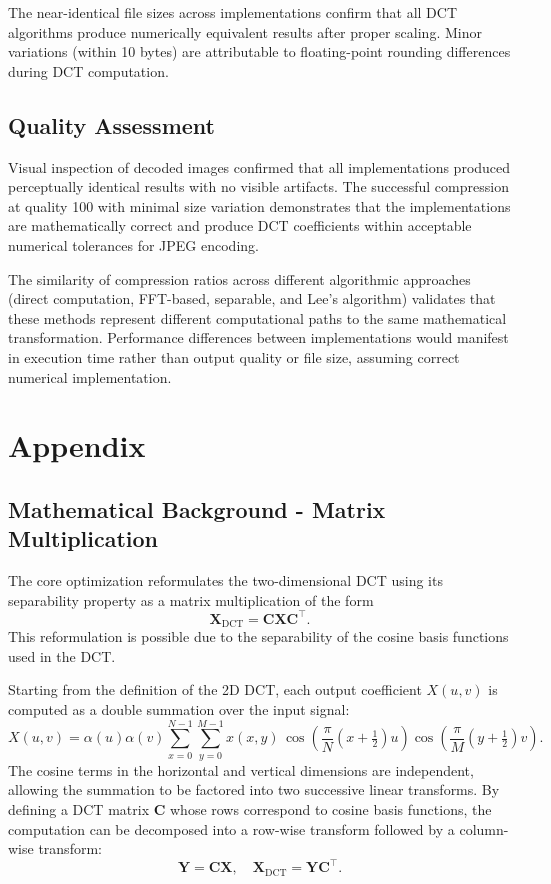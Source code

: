\documentclass{article}
\begin{document}
The near-identical file sizes across implementations confirm that all DCT algorithms produce numerically equivalent results after proper scaling. Minor variations (within 10 bytes) are attributable to floating-point rounding differences during DCT computation.

\subsection{Quality Assessment}

Visual inspection of decoded images confirmed that all implementations produced perceptually identical results with no visible artifacts. The successful compression at quality 100 with minimal size variation demonstrates that the implementations are mathematically correct and produce DCT coefficients within acceptable numerical tolerances for JPEG encoding.

The similarity of compression ratios across different algorithmic approaches (direct computation, FFT-based, separable, and Lee's algorithm) validates that these methods represent different computational paths to the same mathematical transformation. Performance differences between implementations would manifest in execution time rather than output quality or file size, assuming correct numerical implementation.

\newpage


\section{Appendix}
\subsection{Mathematical Background - Matrix Multiplication}
The core optimization reformulates the two-dimensional DCT using its separability property as a matrix multiplication of the form
\[
\mathbf{X}_{\text{DCT}} = \mathbf{C}\mathbf{X}\mathbf{C}^\top.
\]
This reformulation is possible due to the separability of the cosine basis functions used in the DCT.

Starting from the definition of the 2D DCT, each output coefficient $X(u,v)$ is computed as a double summation over the input signal:
\[
X(u,v) = \alpha(u)\alpha(v)
\sum_{x=0}^{N-1}\sum_{y=0}^{M-1}
x(x,y)\,
\cos\left(\frac{\pi}{N}\left(x+\tfrac{1}{2}\right)u\right)
\cos\left(\frac{\pi}{M}\left(y+\tfrac{1}{2}\right)v\right).
\]
The cosine terms in the horizontal and vertical dimensions are independent, allowing the summation to be factored into two successive linear transforms. By defining a DCT matrix $\mathbf{C}$ whose rows correspond to cosine basis functions, the computation can be decomposed into a row-wise transform followed by a column-wise transform:
\[
\mathbf{Y} = \mathbf{C}\mathbf{X}, \quad
\mathbf{X}_{\text{DCT}} = \mathbf{Y}\mathbf{C}^\top.
\]
\end{document}
